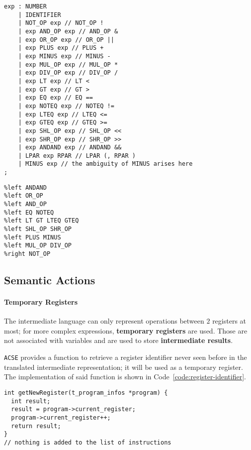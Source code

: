 \begin{onepage}
  \begin{lstlisting}[language=LANCE, caption={Expression grammar}, label={code:expression-grammar}]
exp : NUMBER
    | IDENTIFIER
    | NOT_OP exp // NOT_OP !
    | exp AND_OP exp // AND_OP &
    | exp OR_OP exp // OR_OP ||
    | exp PLUS exp // PLUS +
    | exp MINUS exp // MINUS -
    | exp MUL_OP exp // MUL_OP *
    | exp DIV_OP exp // DIV_OP /
    | exp LT exp // LT <
    | exp GT exp // GT >
    | exp EQ exp // EQ ==
    | exp NOTEQ exp // NOTEQ !=
    | exp LTEQ exp // LTEQ <=
    | exp GTEQ exp // GTEQ >=
    | exp SHL_OP exp // SHL_OP <<
    | exp SHR_OP exp // SHR_OP >>
    | exp ANDAND exp // ANDAND &&
    | LPAR exp RPAR // LPAR (, RPAR )
    | MINUS exp // the ambiguity of MINUS arises here
;
\end{lstlisting}
\end{onepage}

\begin{onepage}
  \begin{lstlisting}[language=LANCE, caption={Expression precedence}, label={code:expression-precedence}]
%left OROR
%left ANDAND
%left OR_OP
%left AND_OP
%left EQ NOTEQ
%left LT GT LTEQ GTEQ
%left SHL_OP SHR_OP
%left PLUS MINUS
%left MUL_OP DIV_OP
%right NOT_OP
\end{lstlisting}
\end{onepage}

\subsection{Semantic Actions}

\paragraph{Temporary Registers}

The intermediate language can only represent operations between \(2\) registers at most;
for more complex expressions, \textbf{temporary registers} are used.
Those are not associated with variables and are used to store \textbf{intermediate results}.

\texttt{ACSE} provides a function to retrieve a register identifier never seen before in the translated intermediate representation;
it will be used as a temporary register.
The implementation of said function is shown in Code~\ref{code:register-identifier}.

\begin{onepage}
  \begin{lstlisting}[language=LANCE, caption={Register identifier}, label={code:register-identifier}]
int getNewRegister(t_program_infos *program) {
  int result;
  result = program->current_register;
  program->current_register++;
  return result;
}
// nothing is added to the list of instructions
\end{lstlisting}
\end{onepage}

